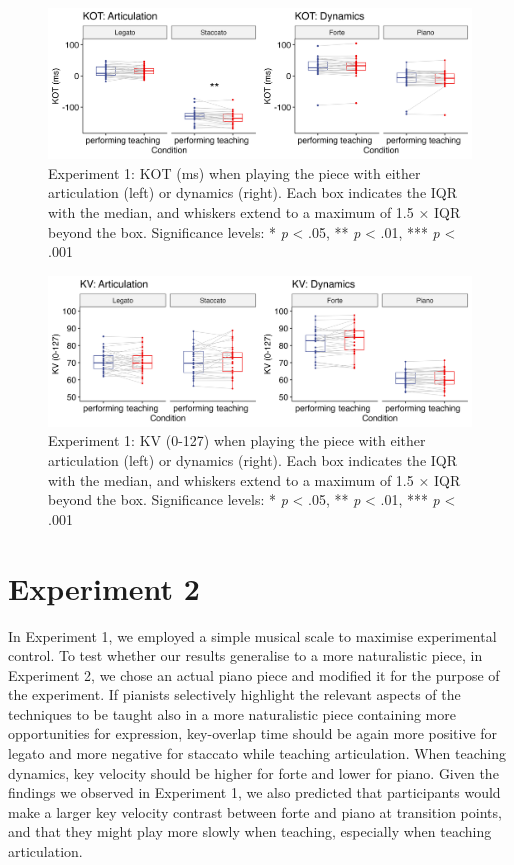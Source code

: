 \documentclass[
  man,floatsintext]{apa6}
\begin{document}
\begin{figure}
\includegraphics[width=1\linewidth]{manuscript_files/figure-latex/plot-kot-1-1} \caption{\label{fig:kot-1}Experiment 1: KOT (ms) when playing the piece with either articulation (left) or dynamics (right). Each box indicates the IQR with the median, and whiskers extend to a maximum of 1.5 × IQR beyond the box. Significance levels: * \textit{p} < .05, ** \textit{p} < .01, *** \textit{p} < .001}\label{fig:plot-kot-1}
\end{figure}

\begin{figure}
\includegraphics[width=1\linewidth]{manuscript_files/figure-latex/plot-vel-1-1} \caption{\label{fig:vel-1}Experiment 1: KV (0-127) when playing the piece with either articulation (left) or dynamics (right). Each box indicates the IQR with the median, and whiskers extend to a maximum of 1.5 × IQR beyond the box. Significance levels: * \textit{p} < .05, ** \textit{p} < .01, *** \textit{p} < .001}\label{fig:plot-vel-1}
\end{figure}

\newpage

\hypertarget{experiment-2}{%
\section{Experiment 2}\label{experiment-2}}

In Experiment 1, we employed a simple musical scale to maximise experimental control. To test whether our results generalise to a more naturalistic piece, in Experiment 2, we chose an actual piano piece and modified it for the purpose of the experiment. If pianists selectively highlight the relevant aspects of the techniques to be taught also in a more naturalistic piece containing more opportunities for expression, key-overlap time should be again more positive for legato and more negative for staccato while teaching articulation. When teaching dynamics, key velocity should be higher for forte and lower for piano. Given the findings we observed in Experiment 1, we also predicted that participants would make a larger key velocity contrast between forte and piano at transition points, and that they might play more slowly when teaching, especially when teaching articulation.
\end{document}
